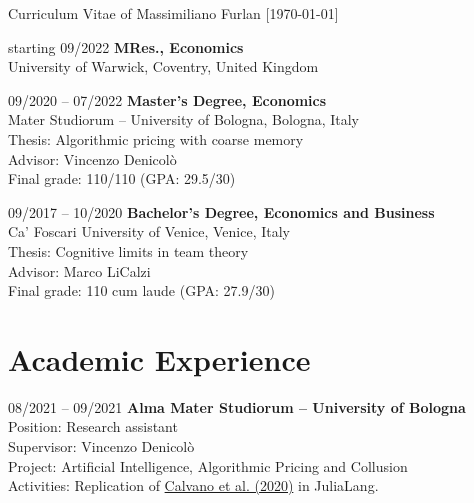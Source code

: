 \documentclass[11pt,a4paper]{article}
\begin{document}
\begin{cv}{\huge Curriculum Vitae of Massimiliano Furlan \large{[\today ]}}
\begin{cvlist}{}
	\item[starting 09/2022] 
		\textbf{MRes., Economics}\\ 
		University of Warwick, Coventry, United Kingdom
	\item[09/2020 -- 07/2022] 
		\textbf{Master's Degree, Economics}\\ 
		 Mater Studiorum -- University of Bologna, Bologna, Italy\\
		Thesis: Algorithmic pricing with coarse memory\\
		Advisor: Vincenzo Denicolò\\
		Final grade: 110/110 \hspace{38pt} (GPA: 29.5/30)
	\item[09/2017 -- 10/2020] 
		\textbf{Bachelor's Degree, Economics and Business}\\
		Ca' Foscari University of Venice, Venice, Italy\\
		Thesis: Cognitive limits in team theory\\
		Advisor: Marco LiCalzi\\
		Final grade: 110 cum laude \quad (GPA: 27.9/30)	
\end{cvlist}
\vspace{-20pt}

\section{Academic Experience}

\begin{cvlist}{}
	\item[08/2021 -- 09/2021]
		\textbf{Alma Mater Studiorum – University of Bologna}\\
		Position: Research assistant\\
		Supervisor: Vincenzo Denicolò\\
		Project: Artificial Intelligence, Algorithmic Pricing and Collusion\\
		Activities: Replication of \href{https://www.aeaweb.org/articles?id=10.1257/aer.20190623}{Calvano et al. (2020)} in JuliaLang.
\end{cvlist}
\vspace{-20pt}


\end{cv}
\end{document}
